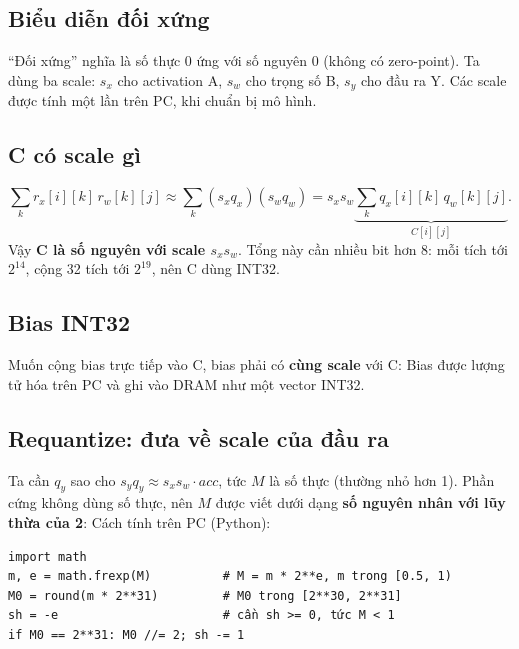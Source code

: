 \documentclass[10pt,a4paper]{article}
\begin{document}
\subsection{Biểu diễn đối xứng}
\eqbox{\[
r ≈ s\cdot q, \qquad q = \text{clamp}\Big(\text{round}\big(\tfrac{r}{s}\big), -127, 127\Big), \qquad s = \frac{\max|r|}{127}.
\]}
“Đối xứng” nghĩa là số thực 0 ứng với số nguyên 0 (không có zero-point). Ta dùng ba scale: $s_x$ cho activation A, $s_w$ cho trọng số B, $s_y$ cho đầu ra Y. Các scale được tính một lần trên PC, khi chuẩn bị mô hình.

\subsection{C có scale gì}
\[
\sum_k r_x[i][k]\, r_w[k][j] ≈ \sum_k (s_x q_x)(s_w q_w) = s_x s_w \underbrace{\sum_k q_x[i][k]\, q_w[k][j]}_{C[i][j]}.
\]
Vậy \textbf{C là số nguyên với scale $s_x s_w$}. Tổng này cần nhiều bit hơn 8: mỗi tích tới $2^{14}$, cộng 32 tích tới $2^{19}$, nên C dùng INT32.

\subsection{Bias INT32}
Muốn cộng bias trực tiếp vào C, bias phải có \textbf{cùng scale} với C:
\eqbox{\[
b_q[j] = \text{round}\Big(\frac{b[j]}{s_x s_w}\Big) \quad \text{(INT32)}, \qquad acc[i][j] = C[i][j] + b_q[j] \;\;≈\;\; \frac{\sum_k r_x r_w + b}{s_x s_w}.
\]}
Bias được lượng tử hóa trên PC và ghi vào DRAM như một vector INT32.

\subsection{Requantize: đưa về scale của đầu ra}
Ta cần $q_y$ sao cho $s_y q_y ≈ s_x s_w \cdot acc$, tức
\eqbox{\[
q_y = \text{round}(M \cdot acc), \qquad M = \frac{s_x s_w}{s_y}.
\]}
$M$ là số thực (thường nhỏ hơn 1). Phần cứng không dùng số thực, nên $M$ được viết dưới dạng \textbf{số nguyên nhân với lũy thừa của 2}:
\eqbox{\[
M ≈ M_0 \cdot 2^{-(31 + sh)}, \qquad M_0 \in [2^{30}, 2^{31}), \quad sh \in \{0, \ldots, 31\}.
\]}
Cách tính trên PC (Python):
\begin{Verbatim}[frame=leftline,framerule=2pt,rulecolor=\color{brand},xleftmargin=6pt,samepage=true]
import math
m, e = math.frexp(M)          # M = m * 2**e, m trong [0.5, 1)
M0 = round(m * 2**31)         # M0 trong [2**30, 2**31]
sh = -e                       # cần sh >= 0, tức M < 1
if M0 == 2**31: M0 //= 2; sh -= 1
\end{Verbatim}
\end{document}
